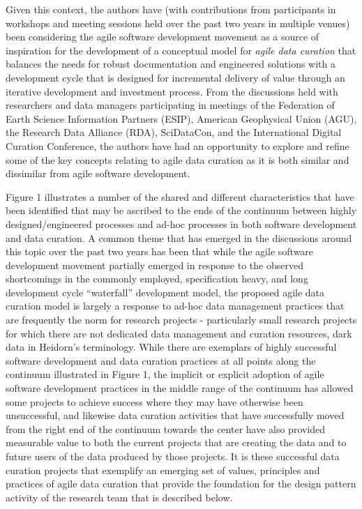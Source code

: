 \documentclass[paper]{ijdc-v9}
\begin{document}
Given this context, the authors have (with contributions from
participants in workshops and meeting sessions held over the past two
years in multiple venues) been considering the agile software
development movement \autocite{beck_manifesto_2001} as a source of
inspiration for the development of a conceptual model for \emph{agile
data curation} that balances the needs for robust documentation and
engineered solutions with a development cycle that is designed for
incremental delivery of value through an iterative development and
investment process. From the discussions held with researchers and data
managers participating in meetings of the Federation of Earth Science
Information Partners (ESIP), American Geophysical Union (AGU), the
Research Data Alliance (RDA), SciDataCon, and the International Digital
Curation Conference, the authors have had an opportunity to explore and
refine some of the key concepts relating to agile data curation as it is
both similar and dissimilar from agile software development.

Figure 1 illustrates a number of the shared and different
characteristics that have been identified that may be ascribed to the
ends of the continuum between highly designed/engineered processes and
ad-hoc processes in both software development and data curation. A
common theme that has emerged in the discussions around this topic over
the past two years has been that while the agile software development
movement partially emerged in response to the observed shortcomings in
the commonly employed, specification heavy, and long development cycle
``waterfall'' development model, the proposed agile data curation model
is largely a response to ad-hoc data management practices that are
frequently the norm for research projects - particularly small research
projects for which there are not dedicated data management and curation
resources, dark data in Heidorn's \autocite*{heidorn_shedding_2008}
terminology. While there are exemplars of highly successful software
development and data curation practices at all points along the
continuum illustrated in Figure 1, the implicit or explicit adoption of
agile software development practices in the middle range of the
continuum has allowed some projects to achieve success where they may
have otherwise been unsuccessful, and likewise data curation activities
that have successfully moved from the right end of the continuum towards
the center have also provided measurable value to both the current
projects that are creating the data and to future users of the data
produced by those projects. It is these successful data curation
projects that exemplify an emerging set of values, principles and
practices of agile data curation that provide the foundation for the
design pattern activity of the research team that is described below.
\end{document}
